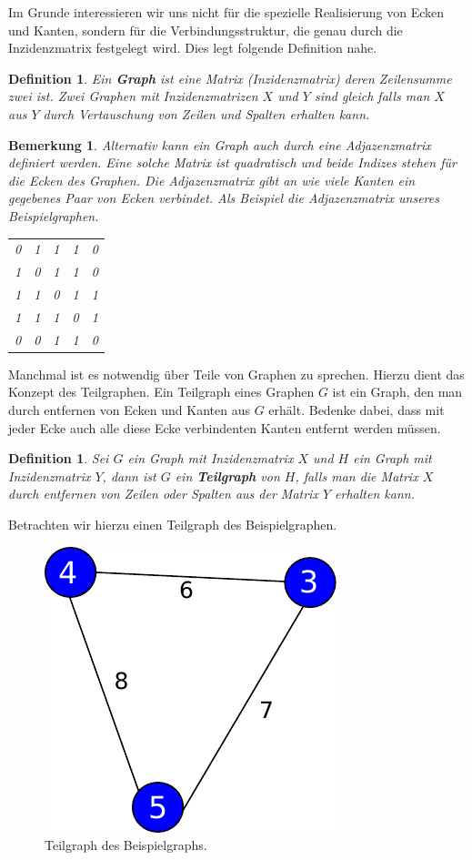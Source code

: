 \documentclass[11pt,a4paper,leqno]{report}
\newtheorem{definition}[theorem]{Definition}
\newtheorem{remark}[theorem]{Bemerkung}
\numberwithin{equation}{chapter}
\begin{document}
	Im Grunde interessieren wir uns nicht f\"ur die spezielle Realisierung von Ecken und Kanten, sondern f\"ur die Verbindungsstruktur, die genau durch die Inzidenzmatrix festgelegt wird. Dies legt folgende Definition nahe.
\begin{definition}
	Ein \textbf{Graph} ist eine Matrix (Inzidenzmatrix) deren Zeilensumme zwei ist. Zwei Graphen mit Inzidenzmatrizen $X$ und $Y$ sind gleich falls man $X$ aus $Y$ durch Vertauschung von Zeilen und Spalten erhalten kann.
\end{definition}
\begin{remark}
	Alternativ kann ein Graph auch durch eine Adjazenzmatrix definiert werden. Eine solche Matrix ist quadratisch und beide Indizes stehen f\"ur die Ecken des Graphen. Die Adjazenzmatrix gibt an wie viele Kanten ein gegebenes Paar von Ecken verbindet.
    Als Beispiel die Adjazenzmatrix unseres Beispielgraphen.
	\begin{center}
	\begin{tabular}{c c c c c}
		0 & 1 & 1 & 1 & 0\\
		1 & 0 & 1 & 1 & 0\\
		1 & 1 & 0 & 1 & 1\\
		1 & 1 & 1 & 0 & 1\\
		0 & 0 & 1 & 1 & 0\\
	\end{tabular} 
\end{center}
\end{remark}
\noindent
Manchmal ist es notwendig \"uber Teile von Graphen zu sprechen. Hierzu dient das Konzept des Teilgraphen. Ein Teilgraph eines Graphen $G$ ist ein Graph, den man durch entfernen von Ecken und Kanten aus $G$ erh\"alt. Bedenke dabei, dass mit jeder Ecke auch alle diese Ecke verbindenten Kanten entfernt werden m\"ussen.
\begin{definition}
	Sei $G$ ein Graph mit Inzidenzmatrix $X$ und $H$ ein Graph mit Inzidenzmatrix $Y$, dann ist $G$ ein \textbf{Teilgraph} von $H$, falls man die Matrix $X$ durch entfernen von Zeilen oder Spalten aus der Matrix $Y$ erhalten kann.
\end{definition}
\noindent
Betrachten wir hierzu einen Teilgraph des Beispielgraphen.
\begin{figure}[H]
	\begin{center}
		\includegraphics[scale=0.4]{Abbildungen/graph_1_teil.pdf}
		\caption{Teilgraph des Beispielgraphs.}
	\end{center}
\end{figure}
\end{document}
